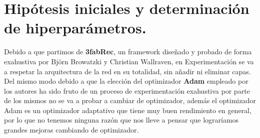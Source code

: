 \section{Hipótesis iniciales y determinación de hiperparámetros.}
    \noindent Debido a que partimos de \textbf{3fabRec}, un framework diseñado y probado de forma exahustiva por Björn Browatzki y Christian Wallraven, en Experimentación se va a respetar la arquitectura de la red en su totalidad, sin añadir ni eliminar capas. Del mismo modo debido a que la elección del optimizador \textbf{Adam} empleado por los autores ha sido fruto de un proceso de experimentación exahustiva por parte de los mismos no se va a probar a cambiar de optimizador, además el optimizador Adam es un optimizador adaptativo que tiene muy buen rendimiento en general, por lo que no tenemos ninguna razón que nos lleve a pensar que lograríamos grandes mejoras cambiando de optimizador. 
\endinput


